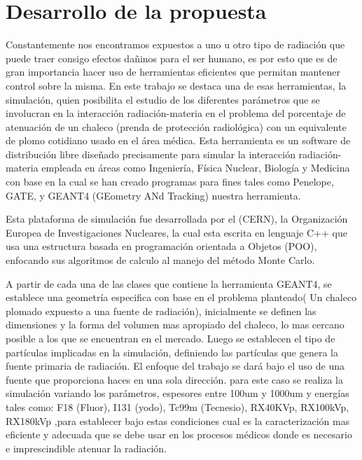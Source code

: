 \documentclass[a4paper,10pt]{article}
\begin{document}

\section{Desarrollo de la propuesta}

Constantemente nos encontramos expuestos a uno u otro tipo de radiación que puede traer consigo efectos dañinos para el ser humano, es por esto que es de gran importancia hacer uso de herramientas eficientes que permitan mantener control sobre la misma. En este trabajo se destaca una de esas herramientas, la simulación, quien posibilita el estudio de los diferentes parámetros que se involucran en la interacción radiación-materia en el problema del porcentaje de atenuación de un chaleco (prenda de protección radiológica) con un equivalente de plomo cotidiano usado en el área médica.  Esta herramienta es un software de distribución libre diseñado precisamente para simular la interacción radiación-materia empleada en áreas como Ingeniería, Física Nuclear, Biología y Medicina con base en la cual se han creado programas para fines  tales como  Penelope, GATE, y GEANT4 (GEometry ANd Tracking) nuestra herramienta.

Esta plataforma de simulación fue desarrollada por el (CERN), la Organización Europea de Investigaciones Nucleares, la cual esta escrita en lenguaje C++ que usa una estructura basada en programación orientada a Objetos (POO), enfocando sus algoritmos de calculo al manejo del método Monte Carlo. 

A partir de cada una de las clases que contiene la herramienta GEANT4, se establece una geometría especifica con base en el problema planteado( Un chaleco plomado expuesto a una fuente de radiación), inicialmente se definen las dimensiones y la forma del volumen mas apropiado del chaleco, lo mas cercano posible a los que se encuentran en el mercado. Luego se establecen el tipo de partículas implicadas en la simulación, definiendo las partículas que genera la fuente primaria de radiación.
El enfoque del trabajo se dará bajo el uso de una fuente que proporciona haces en una sola dirección. para este caso se realiza la simulación variando los parámetros, espesores entre 100um y 1000um y energías tales como: F18 (Fluor), I131 (yodo), Tc99m (Tecnesio), RX40KVp, RX100kVp, RX180kVp ,para establecer bajo estas condiciones cual es la caracterización mas eficiente y adecuada 
que se debe usar en los procesos médicos donde es necesario e imprescindible atenuar la radiación.
\end{document}
